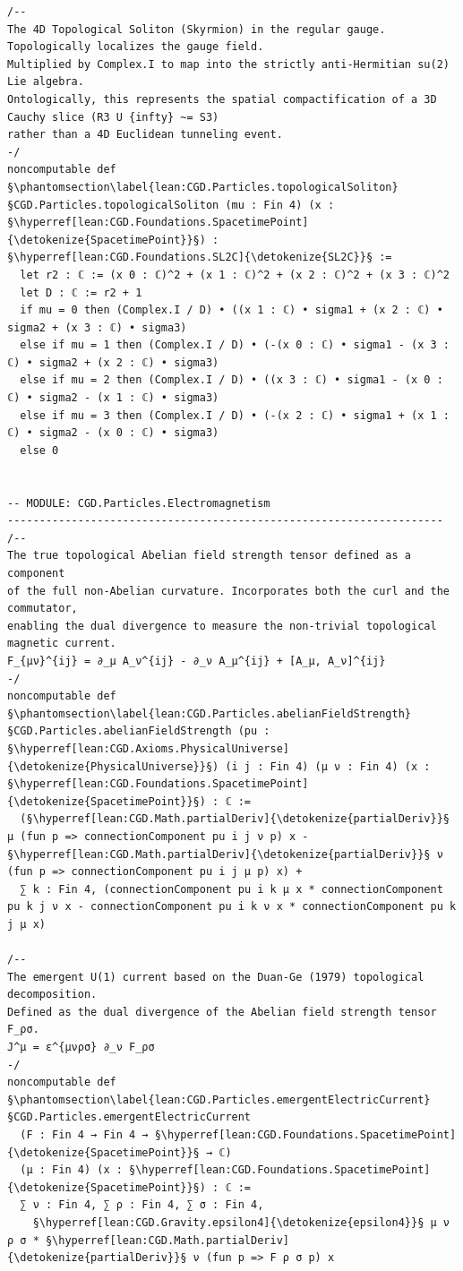 \begin{verbatim}
/--
The 4D Topological Soliton (Skyrmion) in the regular gauge.
Topologically localizes the gauge field.
Multiplied by Complex.I to map into the strictly anti-Hermitian su(2) Lie algebra.
Ontologically, this represents the spatial compactification of a 3D Cauchy slice (R3 U {infty} ~= S3)
rather than a 4D Euclidean tunneling event.
-/
noncomputable def §\phantomsection\label{lean:CGD.Particles.topologicalSoliton}§CGD.Particles.topologicalSoliton (mu : Fin 4) (x : §\hyperref[lean:CGD.Foundations.SpacetimePoint]{\detokenize{SpacetimePoint}}§) : §\hyperref[lean:CGD.Foundations.SL2C]{\detokenize{SL2C}}§ :=
  let r2 : ℂ := (x 0 : ℂ)^2 + (x 1 : ℂ)^2 + (x 2 : ℂ)^2 + (x 3 : ℂ)^2
  let D : ℂ := r2 + 1
  if mu = 0 then (Complex.I / D) • ((x 1 : ℂ) • sigma1 + (x 2 : ℂ) • sigma2 + (x 3 : ℂ) • sigma3)
  else if mu = 1 then (Complex.I / D) • (-(x 0 : ℂ) • sigma1 - (x 3 : ℂ) • sigma2 + (x 2 : ℂ) • sigma3)
  else if mu = 2 then (Complex.I / D) • ((x 3 : ℂ) • sigma1 - (x 0 : ℂ) • sigma2 - (x 1 : ℂ) • sigma3)
  else if mu = 3 then (Complex.I / D) • (-(x 2 : ℂ) • sigma1 + (x 1 : ℂ) • sigma2 - (x 0 : ℂ) • sigma3)
  else 0


-- MODULE: CGD.Particles.Electromagnetism
--------------------------------------------------------------------
/--
The true topological Abelian field strength tensor defined as a component
of the full non-Abelian curvature. Incorporates both the curl and the commutator,
enabling the dual divergence to measure the non-trivial topological magnetic current.
F_{μν}^{ij} = ∂_μ A_ν^{ij} - ∂_ν A_μ^{ij} + [A_μ, A_ν]^{ij}
-/
noncomputable def §\phantomsection\label{lean:CGD.Particles.abelianFieldStrength}§CGD.Particles.abelianFieldStrength (pu : §\hyperref[lean:CGD.Axioms.PhysicalUniverse]{\detokenize{PhysicalUniverse}}§) (i j : Fin 4) (μ ν : Fin 4) (x : §\hyperref[lean:CGD.Foundations.SpacetimePoint]{\detokenize{SpacetimePoint}}§) : ℂ :=
  (§\hyperref[lean:CGD.Math.partialDeriv]{\detokenize{partialDeriv}}§ μ (fun p => connectionComponent pu i j ν p) x - §\hyperref[lean:CGD.Math.partialDeriv]{\detokenize{partialDeriv}}§ ν (fun p => connectionComponent pu i j μ p) x) +
  ∑ k : Fin 4, (connectionComponent pu i k μ x * connectionComponent pu k j ν x - connectionComponent pu i k ν x * connectionComponent pu k j μ x)

/--
The emergent U(1) current based on the Duan-Ge (1979) topological decomposition.
Defined as the dual divergence of the Abelian field strength tensor F_ρσ.
J^μ = ε^{μνρσ} ∂_ν F_ρσ
-/
noncomputable def §\phantomsection\label{lean:CGD.Particles.emergentElectricCurrent}§CGD.Particles.emergentElectricCurrent
  (F : Fin 4 → Fin 4 → §\hyperref[lean:CGD.Foundations.SpacetimePoint]{\detokenize{SpacetimePoint}}§ → ℂ)
  (μ : Fin 4) (x : §\hyperref[lean:CGD.Foundations.SpacetimePoint]{\detokenize{SpacetimePoint}}§) : ℂ :=
  ∑ ν : Fin 4, ∑ ρ : Fin 4, ∑ σ : Fin 4,
    §\hyperref[lean:CGD.Gravity.epsilon4]{\detokenize{epsilon4}}§ μ ν ρ σ * §\hyperref[lean:CGD.Math.partialDeriv]{\detokenize{partialDeriv}}§ ν (fun p => F ρ σ p) x


\end{verbatim}
